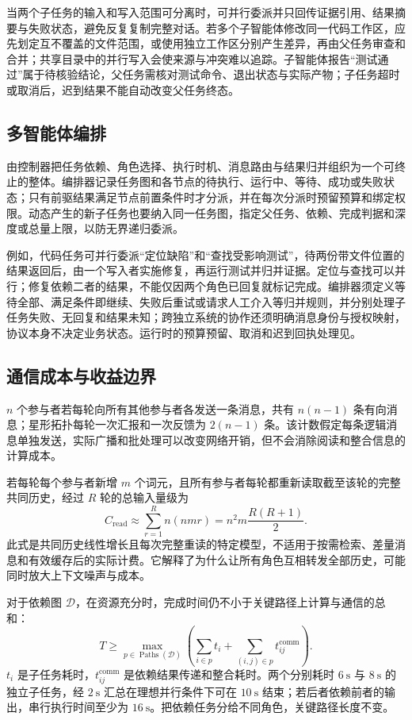 \documentclass[../textbook.tex]{subfiles}
\begin{document}
当两个子任务的输入和写入范围可分离时，可并行委派并只回传证据引用、结果摘要与失败状态，避免反复复制完整对话。若多个子智能体修改同一代码工作区，应先划定互不覆盖的文件范围，或使用独立工作区分别产生差异，再由父任务审查和合并；共享目录中的并行写入会使来源与冲突难以追踪。子智能体报告“测试通过”属于待核验结论，父任务需核对测试命令、退出状态与实际产物；子任务超时或取消后，迟到结果不能自动改变父任务终态。

\subsection{多智能体编排}
由控制器把任务依赖、角色选择、执行时机、消息路由与结果归并组织为一个可终止的整体。编排器记录任务图和各节点的待执行、运行中、等待、成功或失败状态；只有前驱结果满足节点前置条件时才分派，并在每次分派时预留预算和绑定权限。动态产生的新子任务也要纳入同一任务图，指定父任务、依赖、完成判据和深度或总量上限，以防无界递归委派。

例如，代码任务可并行委派“定位缺陷”和“查找受影响测试”，待两份带文件位置的结果返回后，由一个写入者实施修复，再运行测试并归并证据。定位与查找可以并行；修复依赖二者的结果，不能仅因两个角色已回复就标记完成。编排器须定义等待全部、满足条件即继续、失败后重试或请求人工介入等归并规则，并分别处理子任务失败、无回复和结果未知；跨独立系统的协作还须明确消息身份与授权映射，协议本身不决定业务状态。运行时的预算预留、取消和迟到回执处理见。

\subsection{通信成本与收益边界}
$n$ 个参与者若每轮向所有其他参与者各发送一条消息，共有 $n(n-1)$ 条有向消息；星形拓扑每轮一次汇报和一次反馈为 $2(n-1)$ 条。该计数假定每条逻辑消息单独发送，实际广播和批处理可以改变网络开销，但不会消除阅读和整合信息的计算成本。

若每轮每个参与者新增 $m$ 个词元，且所有参与者每轮都重新读取截至该轮的完整共同历史，经过 $R$ 轮的总输入量级为
\begin{equation}
 C_{\mathrm{read}}\approx\sum_{r=1}^{R}n(nmr)=n^2m\frac{R(R+1)}2.
\end{equation}
此式是共同历史线性增长且每次完整重读的特定模型，不适用于按需检索、差量消息和有效缓存后的实际计费。它解释了为什么让所有角色互相转发全部历史，可能同时放大上下文噪声与成本。

对于依赖图 $\mathcal D$，在资源充分时，完成时间仍不小于关键路径上计算与通信的总和：
\begin{equation}
 T\ge\max_{p\in\operatorname{Paths}(\mathcal D)}\left(\sum_{i\in p}t_i+\sum_{(i,j)\in p}t_{ij}^{\mathrm{comm}}\right).
\end{equation}
$t_i$ 是子任务耗时，$t_{ij}^{\mathrm{comm}}$ 是依赖结果传递和整合耗时。两个分别耗时 $\qty{6}{\second}$ 与 $\qty{8}{\second}$ 的独立子任务，经 $\qty{2}{\second}$ 汇总在理想并行条件下可在 $\qty{10}{\second}$ 结束；若后者依赖前者的输出，串行执行时间至少为 $\qty{16}{\second}$。把依赖任务分给不同角色，关键路径长度不变。
\end{document}
